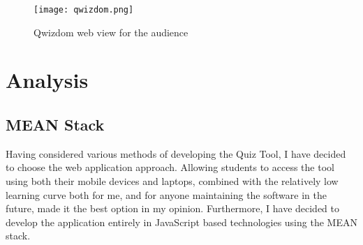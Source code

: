 \begin{figure}[ht]
    \centering
    \texttt{[image: qwizdom.png]}
    \caption{Qwizdom web view for the audience}
    \label{fig:qwizdom}
\end{figure}

\section{Analysis}
%
%
%

\subsection{MEAN Stack}
Having considered various methods of developing the Quiz Tool, I have decided to
choose the web application approach. Allowing students to access the tool using both
their mobile devices and laptops, combined with the relatively low learning curve
both for me, and for anyone maintaining the software in the future, made it the best
option in my opinion. Furthermore, I have decided to develop the application entirely
in JavaScript based technologies using the MEAN stack\cite{18}.

